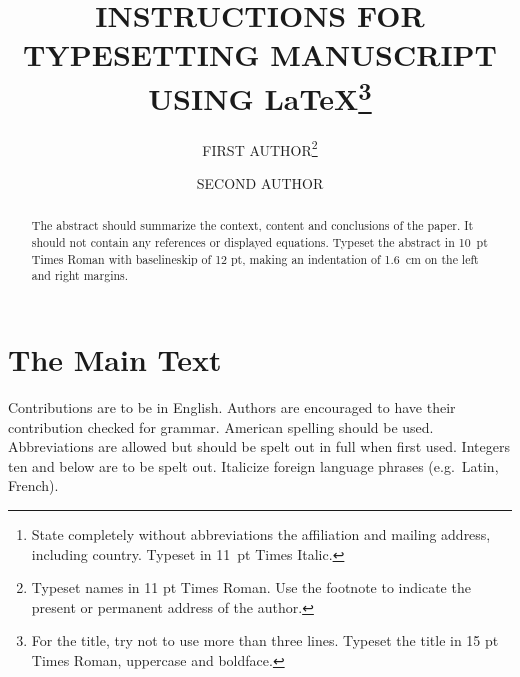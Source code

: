 \documentclass{ws-ijbc}
\begin{document}
\catchline{}{}{}{}{} %


\title{INSTRUCTIONS FOR TYPESETTING MANUSCRIPT\\
USING \LaTeX\footnote{For the title, try not to use more than
three lines. Typeset the title in 15 pt Times Roman, uppercase and
boldface.}}

\author{FIRST AUTHOR\footnote{Typeset names in 11 pt Times Roman.
Use the footnote to indicate the present or permanent address of
the author.}}

\address{University Department, University Name, Address\\
City, State ZIP/Zone, Country\\
fauthor@university.com\footnote{State completely without
abbreviations the affiliation and mailing address, including
country. Typeset in 11~pt Times Italic.}}

\author{SECOND AUTHOR}
\address{Group, Company, Address\\
City, State ZIP/Zone, Country\\
sauthor@company.com}

\maketitle

\begin{history}
\end{history}

\begin{abstract}
The abstract should summarize the context, content and conclusions
of the paper. It should not contain any references or displayed
equations. Typeset the abstract in 10~pt Times Roman with
baselineskip of 12 pt, making an indentation of 1.6~cm on the left
and right margins.
\end{abstract}


\section{The Main Text}
\noindent Contributions are to be in English. Authors are
encouraged to have their contribution checked for grammar.
American spelling should be used. Abbreviations are allowed but
should be spelt out in full when first used. Integers ten and
below are to be spelt out. Italicize foreign language phrases
(e.g.~Latin, French).
\end{document}
